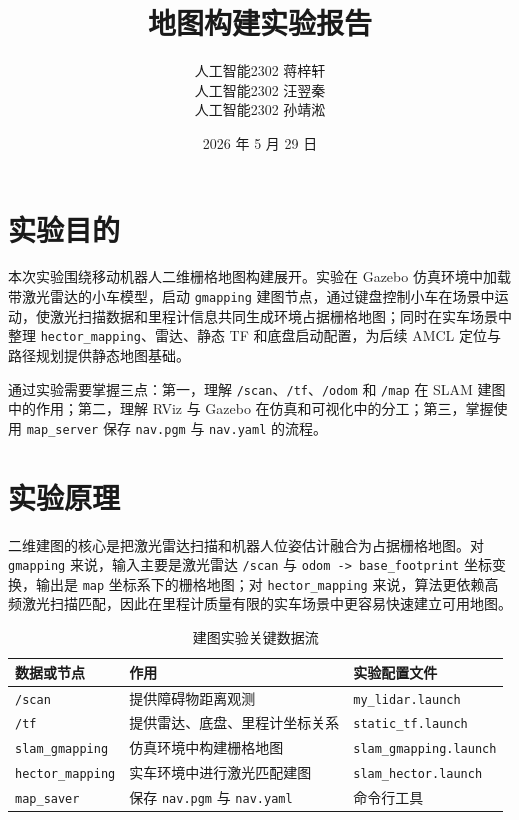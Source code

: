 \documentclass[11pt,a4paper,fontset=fandol]{ctexart}
\title{\bfseries 地图构建实验报告}
\author{人工智能2302 \quad 蒋梓轩\\
人工智能2302 \quad 汪翌秦\\
人工智能2302 \quad 孙靖淞}
\date{2026 年 5 月 29 日}
\begin{document}
\maketitle

\section{实验目的}

本次实验围绕移动机器人二维栅格地图构建展开。实验在 Gazebo 仿真环境中加载带激光雷达的小车模型，启动 \verb|gmapping| 建图节点，通过键盘控制小车在场景中运动，使激光扫描数据和里程计信息共同生成环境占据栅格地图；同时在实车场景中整理 \verb|hector_mapping|、雷达、静态 TF 和底盘启动配置，为后续 AMCL 定位与路径规划提供静态地图基础。

通过实验需要掌握三点：第一，理解 \verb|/scan|、\verb|/tf|、\verb|/odom| 和 \verb|/map| 在 SLAM 建图中的作用；第二，理解 RViz 与 Gazebo 在仿真和可视化中的分工；第三，掌握使用 \verb|map_server| 保存 \verb|nav.pgm| 与 \verb|nav.yaml| 的流程。

\section{实验原理}

二维建图的核心是把激光雷达扫描和机器人位姿估计融合为占据栅格地图。对 \verb|gmapping| 来说，输入主要是激光雷达 \verb|/scan| 与 \verb|odom -> base_footprint| 坐标变换，输出是 \verb|map| 坐标系下的栅格地图；对 \verb|hector_mapping| 来说，算法更依赖高频激光扫描匹配，因此在里程计质量有限的实车场景中更容易快速建立可用地图。

\begin{table}[H]
  \centering
  \caption{建图实验关键数据流}
  \begin{tabular}{lll}
    \toprule
    数据或节点 & 作用 & 实验配置文件 \\
    \midrule
    \verb|/scan| & 提供障碍物距离观测 & \verb|my_lidar.launch| \\
    \verb|/tf| & 提供雷达、底盘、里程计坐标关系 & \verb|static_tf.launch| \\
    \verb|slam_gmapping| & 仿真环境中构建栅格地图 & \verb|slam_gmapping.launch| \\
    \verb|hector_mapping| & 实车环境中进行激光匹配建图 & \verb|slam_hector.launch| \\
    \verb|map_saver| & 保存 \verb|nav.pgm| 与 \verb|nav.yaml| & 命令行工具 \\
    \bottomrule
  \end{tabular}
\end{table}
\end{document}
